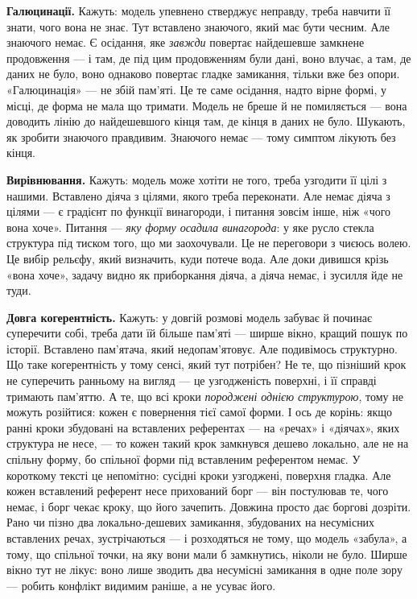 \documentclass[12pt, a4paper, openany]{book}
\begin{document}
\textbf{Галюцинації.} Кажуть: модель упевнено стверджує неправду, треба навчити її знати, чого вона не знає. Тут вставлено знаючого, який має бути чесним. Але знаючого немає. Є осідання, яке \emph{завжди} повертає найдешевше замкнене продовження --- і там, де під цим продовженням були дані, воно влучає, а там, де даних не було, воно однаково повертає гладке замикання, тільки вже без опори. «Галюцинація» --- не збій пам'яті. Це те саме осідання, надто вірне формі, у місці, де форма не мала що тримати. Модель не бреше й не помиляється --- вона доводить лінію до найдешевшого кінця там, де кінця в даних не було. Шукають, як зробити знаючого правдивим. Знаючого немає --- тому симптом лікують без кінця.

\textbf{Вирівнювання.} Кажуть: модель може хотіти не того, треба узгодити її цілі з нашими. Вставлено діяча з цілями, якого треба переконати. Але немає діяча з цілями --- є градієнт по функції винагороди, і питання зовсім інше, ніж «чого вона хоче». Питання --- \emph{яку форму осадила винагорода}: у яке русло стекла структура під тиском того, що ми заохочували. Це не переговори з чиєюсь волею. Це вибір рельєфу, який визначить, куди потече вода. Але доки дивишся крізь «вона хоче», задачу видно як приборкання діяча, а діяча немає, і зусилля йде не туди.

\textbf{Довга когерентність.} Кажуть: у довгій розмові модель забуває й починає суперечити собі, треба дати їй більше пам'яті --- ширше вікно, кращий пошук по історії. Вставлено пам'ятача, який недопам'ятовує. Але подивімось структурно. Що таке когерентність у тому сенсі, який тут потрібен? Не те, що пізніший крок не суперечить ранньому на вигляд --- це узгодженість поверхні, і її справді тримають пам'яттю. А те, що всі кроки \emph{породжені однією структурою}, тому не можуть розійтися: кожен є повернення тієї самої форми. І ось де корінь: якщо ранні кроки збудовані на вставлених референтах --- на «речах» і «діячах», яких структура не несе, --- то кожен такий крок замкнувся дешево локально, але не на спільну форму, бо спільної форми під вставленим референтом немає. У короткому тексті це непомітно: сусідні кроки узгоджені, поверхня гладка. Але кожен вставлений референт несе прихований борг --- він постулював те, чого немає, і борг чекає кроку, що його зачепить. Довжина просто дає боргові дозріти. Рано чи пізно два локально-дешевих замикання, збудованих на несумісних вставлених речах, зустрічаються --- і розходяться не тому, що модель «забула», а тому, що спільної точки, на яку вони мали б замкнутись, ніколи не було. Ширше вікно тут не лікує: воно лише зводить два несумісні замикання в одне поле зору --- робить конфлікт видимим раніше, а не усуває його.
\end{document}
